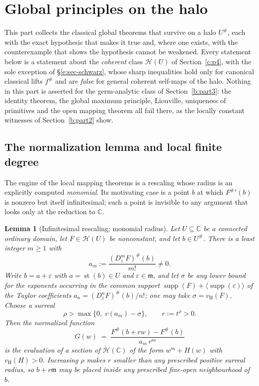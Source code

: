 \documentclass[11pt,a4paper]{article}
\numberwithin{equation}{section}
\newtheorem{lemma}[theorem]{Lemma}
\theoremstyle{definition}
\theoremstyle{remark}
\theoremstyle{plain}
\newcommand{\CC}{\mathbb C}
\newcommand{\mm}{\mathfrak m}
\DeclareMathOperator{\supp}{supp}
\DeclareMathOperator{\st}{st}
\newcommand{\tm}{t}
\newcommand{\halo}[1]{#1^{\#}}
\newcommand{\ev}[1]{#1^{\#}}
\newcommand{\Hc}{\mathcal H}
\newcommand{\vH}{v_{\mathrm H}}
\newcommand{\Neu}[1]{\langle #1\rangle}
\begin{document}
\section{Global principles on the halo}\label{e:p8}

This part collects the classical global theorems that survive on a halo
$\halo U$, each with the exact hypothesis that makes it true and, where
one exists, with the counterexample that shows the hypothesis cannot be
weakened.  Every statement below is a statement about the \emph{coherent}
class $\Hc(U)$ of Section~\ref{c:p4}, with the sole exception of
\S\ref{e:sec-schwarz}, whose sharp inequalities hold only for canonical
classical lifts $\ev f$ and are \emph{false} for general coherent
self-maps of the halo.  Nothing in this part is asserted for the
germ-analytic class of Section~\ref{b:part3}: the identity theorem, the global maximum
principle, Liouville, uniqueness of primitives and the open mapping
theorem all fail there, as the locally constant witnesses of Section~\ref{b:part2} show.

\subsection{The normalization lemma and local finite degree}
\label{e:sec-openmapping}

The engine of the local mapping theorems is a rescaling whose radius is an
explicitly computed \emph{monomial}.  Its motivating case is a point $b$
at which $\ev F{}'(b)$ is nonzero but itself infinitesimal; such a point is
invisible to any argument that looks only at the reduction to $\CC$.

\begin{lemma}[Infinitesimal rescaling; monomial radius]\label{e:lem-normalize}
Let $U\subseteq\CC$ be a connected ordinary domain, let $F\in\Hc(U)$ be
nonconstant, and let $b\in\halo U$.  There is a least integer $m\ge1$ with
\[
 a_m:=\frac{(D_z^mF)^{\#}(b)}{m!}\ne0 .
\]
Write $b=a+\varepsilon$ with $a=\st(b)\in U$ and $\varepsilon\in\mm$, and
let $\sigma$ be any lower bound for the exponents occurring in the common
support
$\supp(F)+\Neu{\supp(\varepsilon)}$
of the Taylor coefficients $a_n=(D_z^nF)^{\#}(b)/n!$; one may take
$\sigma=\vH(F)$.  Choose a surreal
\begin{equation}\label{e:eq-rho}
 \rho>\max\bigl\{0,\;v(a_m)-\sigma\bigr\},
 \qquad r:=\tm^{\rho}>0 .
\end{equation}
Then the normalized function
\begin{equation}\label{e:eq-normalize}
 G(w)\;=\;\frac{\ev F(b+rw)-\ev F(b)}{a_m\,r^{m}}
\end{equation}
is the evaluation of a section of $\Hc(\CC)$ of the form $w^m+H(w)$ with
$\vH(H)>0$.  Increasing $\rho$ makes $r$ smaller than any prescribed
positive surreal radius, so $b+r\mm$ may be placed inside any prescribed
fine-open neighbourhood of $b$.
\end{lemma}
\end{document}

